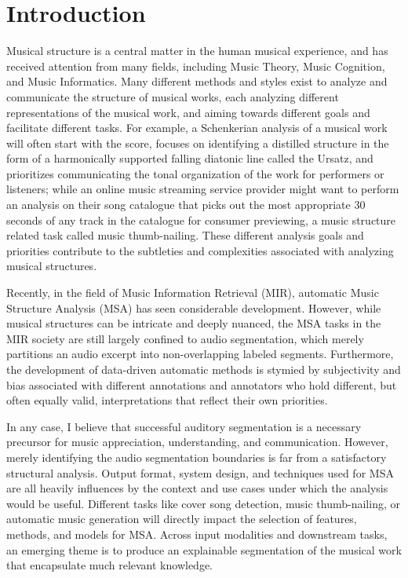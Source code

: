 \section{Introduction}
Musical structure is a central matter in the human musical experience, and has received attention from many fields, including Music Theory, Music Cognition, and Music Informatics.
Many different methods and styles exist to analyze and communicate the structure of musical works, each analyzing different representations of the musical work, and aiming towards different goals and facilitate different tasks.
For example, a Schenkerian analysis of a musical work will often start with the score, focuses on identifying a distilled structure in the form of a harmonically supported falling diatonic line called the Ursatz, and prioritizes communicating the tonal organization of the work for performers or listeners; while an online music streaming service provider might want to perform an analysis on their song catalogue that picks out the most appropriate 30 seconds of any track in the catalogue for consumer previewing, a music structure related task called music thumb-nailing.
These different analysis goals and priorities contribute to the subtleties and complexities associated with analyzing musical structures.

Recently, in the field of Music Information Retrieval (MIR), automatic Music Structure Analysis (MSA) has seen considerable development.
However, while musical structures can be intricate and deeply nuanced, the MSA tasks in the MIR society are still largely confined to audio segmentation, which merely partitions an audio excerpt into non-overlapping labeled segments.
Furthermore, the development of data-driven automatic methods is stymied by subjectivity and bias associated with different annotations and annotators who hold different, but often equally valid, interpretations that reflect their own priorities.

In any case, I believe that successful auditory segmentation is a necessary precursor for music appreciation, understanding, and communication. However, merely identifying the audio segmentation boundaries is far from a satisfactory structural analysis. 
Output format, system design, and techniques used for MSA are all heavily influences by the context and use cases under which the analysis would be useful. 
Different tasks like cover song detection, music thumb-nailing, or automatic music generation will directly impact the selection of features, methods, and models for MSA. 
Across input modalities and downstream tasks, an emerging theme is to produce an explainable segmentation of the musical work that encapsulate much relevant knowledge.

